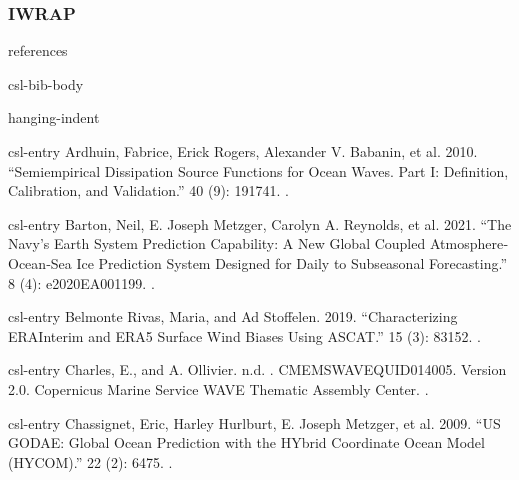 \documentclass[a4paper,10pt,english]{sphinxmanual}
\begin{document}
\subsubsection{IWRAP}
\label{\detokenize{05_reference_datasets:iwrap}}
\begin{sphinxuseclass}{references}
\begin{sphinxuseclass}{csl-bib-body}
\begin{sphinxuseclass}{hanging-indent}
\begin{sphinxuseclass}{csl-entry}
\sphinxAtStartPar
Ardhuin, Fabrice, Erick Rogers, Alexander V. Babanin, et al. 2010. “Semiempirical Dissipation Source Functions for Ocean Waves. Part I: Definition, Calibration, and Validation.”  40 (9): 1917\textendash{}41. .

\end{sphinxuseclass}
\begin{sphinxuseclass}{csl-entry}
\sphinxAtStartPar
Barton, Neil, E. Joseph Metzger, Carolyn A. Reynolds, et al. 2021. “The Navy’s Earth System Prediction Capability: A New Global Coupled Atmosphere‐Ocean‐Sea Ice Prediction System Designed for Daily to Subseasonal Forecasting.”  8 (4): e2020EA001199. .

\end{sphinxuseclass}
\begin{sphinxuseclass}{csl-entry}
\sphinxAtStartPar
Belmonte Rivas, Maria, and Ad Stoffelen. 2019. “Characterizing ERA\sphinxhyphen{}Interim and ERA5 Surface Wind Biases Using ASCAT.”  15 (3): 831\textendash{}52. .

\end{sphinxuseclass}
\begin{sphinxuseclass}{csl-entry}
\sphinxAtStartPar
Charles, E., and A. Ollivier. n.d. . CMEMS\sphinxhyphen{}WAVE\sphinxhyphen{}QUID\sphinxhyphen{}014\sphinxhyphen{}005. Version 2.0. Copernicus Marine Service WAVE Thematic Assembly Center. .

\end{sphinxuseclass}
\begin{sphinxuseclass}{csl-entry}
\sphinxAtStartPar
Chassignet, Eric, Harley Hurlburt, E. Joseph Metzger, et al. 2009. “US GODAE: Global Ocean Prediction with the HYbrid Coordinate Ocean Model (HYCOM).”  22 (2): 64\textendash{}75. .


\end{sphinxuseclass}
\end{sphinxuseclass}
\end{sphinxuseclass}
\end{sphinxuseclass}
\end{document}
